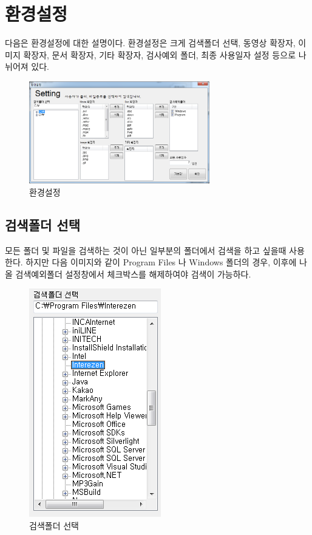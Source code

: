 \documentclass[letterpaper, 11pt]{article} %
\begin{document}
	\section{환경설정}
	다음은 환경설정에 대한 설명이다.	환경설정은 크게 검색폴더 선택, 동영상 확장자, 이미지 확장자, 문서 확장자, 기타 확장자, 검사예외 폴더, 최종 사용일자 설정 등으로 나뉘어져 있다.
	\begin{figure}[h]
		\centering
		\includegraphics[width=0.7\textwidth]{Figures/Setting}
		\caption{환경설정}
		\label{fig:setting}
	\end{figure}
	\subsection{검색폴더 선택}
	모든 폴더 및 파일을 검색하는 것이 아닌 일부분의 폴더에서 검색을 하고 싶을때 사용한다. 하지만 다음 이미지와 같이 Program Files 나 Windows 폴더의 경우, 이후에 나올 검색예외폴더 설정창에서 체크박스를 해제하여야 검색이 가능하다.
	
	\begin{figure}[h]
		\centering
		\includegraphics[height=0.35\textheight]{Figures/searchfolder}
		\caption{검색폴더 선택}
		\label{fig:searchfolder}
	\end{figure}
	
\end{document}
